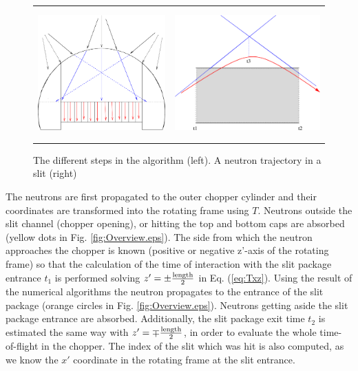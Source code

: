 \begin{figure}
\begin{center}
\begin{tabular}{cc}
\includegraphics[height=5cm]{./figures/FCAlgo.eps}
&
\includegraphics[height=5cm]{./figures/FCtangents.eps}
\end{tabular}
\end{center}
\caption{The different steps in the algorithm (left). A neutron trajectory in a slit (right)}
\label{fig:TOFalg.eps}
\end{figure}

The neutrons are first propagated to the outer chopper cylinder and their coordinates are transformed into the rotating frame using $T$. Neutrons outside the slit channel (chopper opening), or hitting the top and bottom caps are absorbed (yellow dots in Fig. \ref{fig:Overview.eps}). The side from which the neutron approaches the chopper is known (positive or negative z'-axis of the rotating frame) so that the calculation of the time of interaction with the slit package entrance $t_1$ is performed solving $z' = \pm \frac{\rm length}{2}$ in Eq. (\ref{eq:Txz}). Using the result of the numerical algorithms the neutron propagates to the entrance of the slit package (orange circles in Fig. \ref{fig:Overview.eps}). Neutrons getting aside the slit package entrance are absorbed. Additionally, the slit package exit time $t_2$ is estimated the same way with $z' = \mp \frac{\rm length}{2}$, in order to evaluate the whole time-of-flight in the chopper. The index of the slit which was hit is also computed, as we know the $x'$ coordinate in the rotating frame at the slit entrance.

